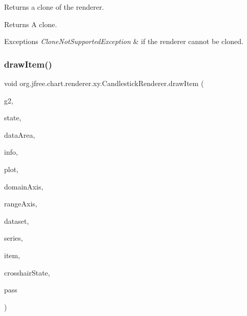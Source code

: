 Returns a clone of the renderer.

\begin{DoxyReturn}{Returns}
A clone.
\end{DoxyReturn}

\begin{DoxyExceptions}{Exceptions}
{\em Clone\+Not\+Supported\+Exception} & if the renderer cannot be cloned. \\
\hline
\end{DoxyExceptions}
\mbox{\label{classorg_1_1jfree_1_1chart_1_1renderer_1_1xy_1_1_candlestick_renderer_aa88e077433fecfa7ce85ae2269bc8cf8}} 
\subsubsection{\texorpdfstring{draw\+Item()}{drawItem()}}
{\footnotesize\ttfamily void org.\+jfree.\+chart.\+renderer.\+xy.\+Candlestick\+Renderer.\+draw\+Item (\begin{DoxyParamCaption}\item[{Graphics2D}]{g2,  }\item[{\mbox{\hyperlink{classorg_1_1jfree_1_1chart_1_1renderer_1_1xy_1_1_x_y_item_renderer_state}{X\+Y\+Item\+Renderer\+State}}}]{state,  }\item[{Rectangle2D}]{data\+Area,  }\item[{\mbox{\hyperlink{classorg_1_1jfree_1_1chart_1_1plot_1_1_plot_rendering_info}{Plot\+Rendering\+Info}}}]{info,  }\item[{\mbox{\hyperlink{classorg_1_1jfree_1_1chart_1_1plot_1_1_x_y_plot}{X\+Y\+Plot}}}]{plot,  }\item[{\mbox{\hyperlink{classorg_1_1jfree_1_1chart_1_1axis_1_1_value_axis}{Value\+Axis}}}]{domain\+Axis,  }\item[{\mbox{\hyperlink{classorg_1_1jfree_1_1chart_1_1axis_1_1_value_axis}{Value\+Axis}}}]{range\+Axis,  }\item[{\mbox{\hyperlink{interfaceorg_1_1jfree_1_1data_1_1xy_1_1_x_y_dataset}{X\+Y\+Dataset}}}]{dataset,  }\item[{int}]{series,  }\item[{int}]{item,  }\item[{\mbox{\hyperlink{classorg_1_1jfree_1_1chart_1_1plot_1_1_crosshair_state}{Crosshair\+State}}}]{crosshair\+State,  }\item[{int}]{pass }\end{DoxyParamCaption})}

